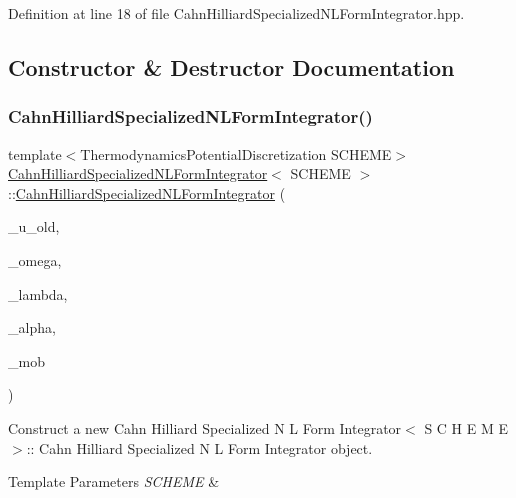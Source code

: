 Definition at line 18 of file Cahn\+Hilliard\+Specialized\+N\+L\+Form\+Integrator.\+hpp.



\subsection{Constructor \& Destructor Documentation}
\mbox{\label{classCahnHilliardSpecializedNLFormIntegrator_ae3a67d5fc74eecc6f587ea9b1a84c984}} 
\subsubsection{\texorpdfstring{Cahn\+Hilliard\+Specialized\+N\+L\+Form\+Integrator()}{CahnHilliardSpecializedNLFormIntegrator()}}
{\footnotesize\ttfamily template$<$Thermodynamics\+Potential\+Discretization S\+C\+H\+E\+ME$>$ \\
\hyperlink{classCahnHilliardSpecializedNLFormIntegrator}{Cahn\+Hilliard\+Specialized\+N\+L\+Form\+Integrator}$<$ S\+C\+H\+E\+ME $>$\+::\hyperlink{classCahnHilliardSpecializedNLFormIntegrator}{Cahn\+Hilliard\+Specialized\+N\+L\+Form\+Integrator} (\begin{DoxyParamCaption}\item[{const mfem\+::\+Grid\+Function \&}]{\+\_\+u\+\_\+old,  }\item[{const double \&}]{\+\_\+omega,  }\item[{const double \&}]{\+\_\+lambda,  }\item[{const double \&}]{\+\_\+alpha,  }\item[{\hyperlink{classMobilityCoefficient}{Mobility\+Coefficient}}]{\+\_\+mob }\end{DoxyParamCaption})}



Construct a new Cahn Hilliard Specialized N L Form Integrator$<$ S C H E M E$>$\+:\+: Cahn Hilliard Specialized N L Form Integrator object. 


\begin{DoxyTemplParams}{Template Parameters}
{\em S\+C\+H\+E\+ME} & \\
\hline
\end{DoxyTemplParams}

